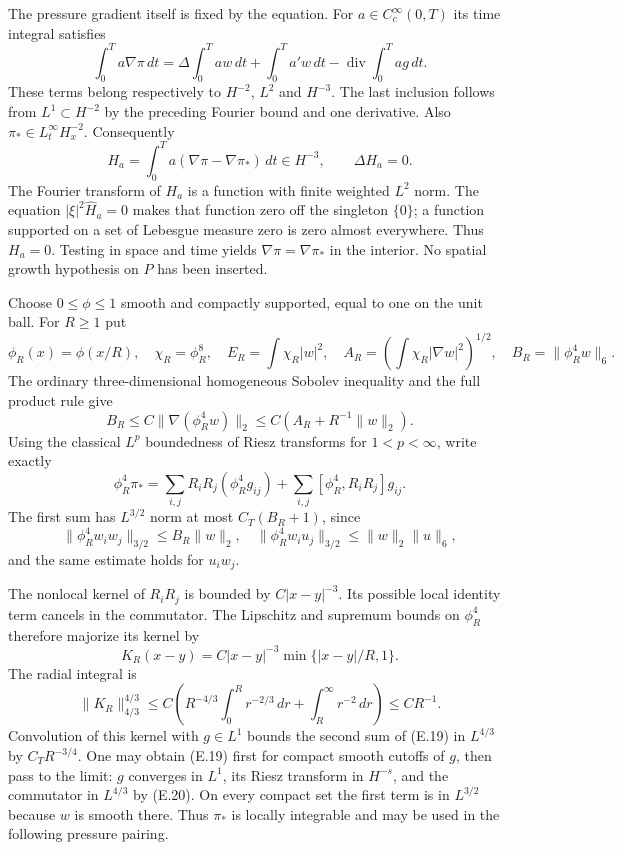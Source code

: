 \documentclass[10pt,a4paper]{article}
\begin{document}
The pressure gradient itself is fixed by the equation. For
$a\in C_c^\infty(0,T)$ its time integral satisfies
\[
 \int_0^T a\nabla\pi\,dt
 =\Delta\int_0^T aw\,dt+\int_0^T a'w\,dt
                -\operatorname{div}\int_0^T ag\,dt.
\]
These terms belong respectively to $H^{-2}$, $L^2$ and $H^{-3}$.
The last inclusion follows from $L^1\subset H^{-2}$ by the preceding
Fourier bound and one derivative. Also $\pi_*\in L^\infty_tH^{-2}_x$.
Consequently
\[
 H_a=\int_0^T a(\nabla\pi-\nabla\pi_*)\,dt\in H^{-3},
 \qquad \Delta H_a=0.
\]
The Fourier transform of $H_a$ is a function with finite weighted
$L^2$ norm. The equation $|\xi|^2\widehat H_a=0$ makes that function
zero off the singleton $\{0\}$; a function supported on a set of
Lebesgue measure zero is zero almost everywhere. Thus $H_a=0$.
Testing in space and time yields $\nabla\pi=\nabla\pi_*$ in the
interior. No spatial growth hypothesis on $P$ has been inserted.

Choose $0\le\phi\le1$ smooth and compactly supported, equal to one on
the unit ball. For $R\ge1$ put
\[
 \phi_R(x)=\phi(x/R),\quad \chi_R=\phi_R^8,\quad
 E_R=\int\chi_R|w|^2,\quad
 A_R=\left(\int\chi_R|\nabla w|^2\right)^{1/2},\quad
 B_R=\|\phi_R^4w\|_6.
\]
The ordinary three-dimensional homogeneous Sobolev inequality and
the full product rule give
\[
 B_R\le C\|\nabla(\phi_R^4w)\|_2
     \le C(A_R+R^{-1}\|w\|_2).
 \tag{E.18}
\]
Using the classical $L^p$ boundedness of Riesz transforms for
$1<p<\infty$, write exactly
\[
 \phi_R^4\pi_*=
 \sum_{i,j}R_iR_j(\phi_R^4g_{ij})+
 \sum_{i,j}[\phi_R^4,R_iR_j]g_{ij}.
 \tag{E.19}
\]
The first sum has $L^{3/2}$ norm at most $C_T(B_R+1)$, since
\[
 \|\phi_R^4w_iw_j\|_{3/2}\le B_R\|w\|_2,\quad
 \|\phi_R^4w_iu_j\|_{3/2}
       \le\|w\|_2\|u\|_6,
\]
and the same estimate holds for $u_iw_j$.

The nonlocal kernel of $R_iR_j$ is bounded by $C|x-y|^{-3}$.
Its possible local identity term cancels in the commutator. The
Lipschitz and supremum bounds on $\phi_R^4$ therefore majorize its
kernel by
\[
 K_R(x-y)=C|x-y|^{-3}\min\{|x-y|/R,1\}.
\]
The radial integral is
\[
 \|K_R\|_{4/3}^{4/3}
 \le C\left(R^{-4/3}\int_0^Rr^{-2/3}\,dr
                      +\int_R^\infty r^{-2}\,dr\right)
 \le CR^{-1}.
 \tag{E.20}
\]
Convolution of this kernel with $g\in L^1$ bounds the second sum of
(E.19) in $L^{4/3}$ by $C_TR^{-3/4}$. One may obtain (E.19) first for
compact smooth cutoffs of $g$, then pass to the limit: $g$ converges
in $L^1$, its Riesz transform in $H^{-s}$, and the commutator in
$L^{4/3}$ by (E.20). On every compact set the first term is in
$L^{3/2}$ because $w$ is smooth there. Thus $\pi_*$ is locally
integrable and may be used in the following pressure pairing.
\end{document}
